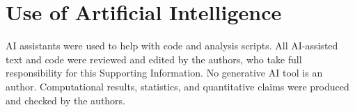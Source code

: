 \documentclass[journal=jcisd8,manuscript=suppinfo,layout=traditional]{achemso}
\begin{document}






\section*{Use of Artificial Intelligence}

AI assistants were used to help with code and analysis scripts. All AI-assisted text and code were reviewed and edited by the authors, who take full responsibility for this Supporting Information. No generative AI tool is an author. Computational results, statistics, and quantitative claims were produced and checked by the authors.


\end{document}
